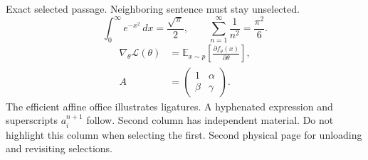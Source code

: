 \documentclass[twocolumn]{article}
\begin{document}
Exact selected passage. Neighboring sentence must stay unselected.
\[
\int_0^\infty e^{-x^2}\,dx=\frac{\sqrt{\pi}}{2},\qquad
\sum_{n=1}^{\infty}\frac{1}{n^2}=\frac{\pi^2}{6}.
\]
\begin{align}
\nabla_\theta\mathcal{L}(\theta)&=\mathbb{E}_{x\sim p}\left[\frac{\partial f_\theta(x)}{\partial\theta}\right],\\
A&=\begin{pmatrix}1&\alpha\\\beta&\gamma\end{pmatrix}.
\end{align}
The efficient affine office illustrates ligatures. A hyphenated expression and superscripts $a_i^{n+1}$ follow.
\newpage
Second column has independent material. Do not highlight this column when selecting the first.
\newpage
Second physical page for unloading and revisiting selections.
\newpage\null\newpage\null\newpage\null\newpage\null\newpage\null\newpage\null\newpage\null\newpage\null
\end{document}
